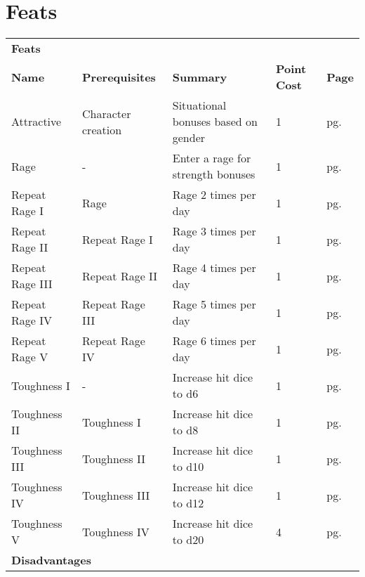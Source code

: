 \chapter{Feats}\label{feats}

\begin{multicols*}{2}
    \begin{table*}[ht]
        \unclassedrowcolors
        \begin{tabularx}{\textwidth}{l X X l l}
            \multicolumn{5}{l}{\textbf{Feats}} \\
            \textbf{Name} & \textbf{Prerequisites} & \textbf{Summary} & \textbf{Point Cost} & \textbf{Page} \\
            Attractive & Character creation & Situational bonuses based on gender & 1 & pg. \pageref{feat:attractive} \\
            Rage & - & Enter a rage for strength bonuses & 1 & pg. \pageref{feat:rage} \\
            \quad Repeat Rage I & Rage & Rage 2 times per day & 1 & pg. \pageref{feat:repeatrage1} \\
            \quad Repeat Rage II & Repeat Rage I & Rage 3 times per day & 1 & pg. \pageref{feat:repeatrage2} \\
            \quad Repeat Rage III & Repeat Rage II & Rage 4 times per day & 1 & pg. \pageref{feat:repeatrage3} \\
            \quad Repeat Rage IV & Repeat Rage III & Rage 5 times per day & 1 & pg. \pageref{feat:repeatrage4} \\
            \quad Repeat Rage V & Repeat Rage IV & Rage 6 times per day & 1 & pg. \pageref{feat:repeatrage5} \\
            Toughness I & - & Increase hit dice to d6 & 1 & pg. \pageref{feat:toughness1} \\
            \quad Toughness II & Toughness I & Increase hit dice to d8 & 1 & pg. \pageref{feat:toughness2} \\
            \quad Toughness III & Toughness II & Increase hit dice to d10 & 1 & pg. \pageref{feat:toughness3} \\
            \quad Toughness IV & Toughness III & Increase hit dice to d12 & 1 & pg. \pageref{feat:toughness4} \\
            \quad Toughness V & Toughness IV & Increase hit dice to d20 & 4 & pg. \pageref{feat:toughness5} \\
            \multicolumn{5}{l}{\textbf{Disadvantages}} \\

\end{tabularx}
\end{table*}
\end{multicols*}
